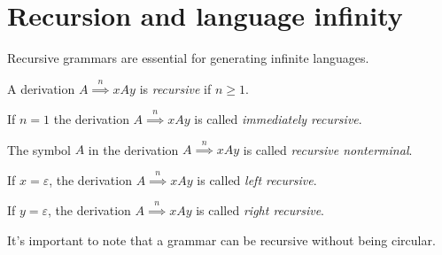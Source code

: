 \section{Recursion and language infinity}

Recursive grammars are essential for generating infinite languages.
\begin{definition}
    A derivation $A\overset{n}{\implies}xAy$ is \emph{recursive} if $n \geq 1$. 

    If $n=1$ the derivation $A\overset{n}{\implies}xAy$ is called \emph{immediately recursive}. 

    The symbol $A$ in the derivation $A\overset{n}{\implies}xAy$ is called \emph{recursive nonterminal}. 

    If $x=\varepsilon$, the derivation $A\overset{n}{\implies}xAy$ is called \emph{left recursive}.

    If $y=\varepsilon$, the derivation $A\overset{n}{\implies}xAy$ is called \emph{right recursive}.
\end{definition}
It's important to note that a grammar can be recursive without being circular.

